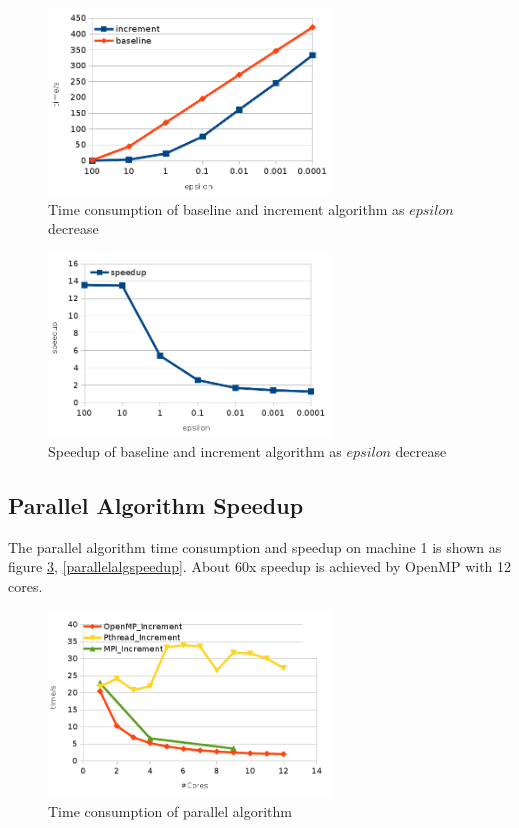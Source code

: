 \documentclass{acm_proc_article-sp}
\begin{document}
\begin{figure}[htbp]
\centering 
\includegraphics[width=7.5cm]{epsilonIncrementTimeConsumption.png}
\caption{Time consumption of baseline and increment algorithm as $epsilon$ decrease}
\label{epsilonIncrementTimeConsumption} 
\end{figure}

\begin{figure}[htbp]
\centering 
\includegraphics[width=7.5cm]{epsilonIncrementSpeedup.png}
\caption{Speedup of baseline and increment algorithm as $epsilon$ decrease}
\label{epsilonIncrementSpeedup} 
\end{figure}

\subsection{Parallel Algorithm Speedup}

The parallel algorithm time consumption and speedup on machine 1 is shown as figure \ref{parallelalgtime}, \ref{parallelalgspeedup}. About 60x speedup is achieved by OpenMP with 12 cores.

\begin{figure}[htbp]
\centering 
\includegraphics[width=7.5cm]{parallelalgtime.png}
\caption{Time consumption of parallel algorithm}
\label{parallelalgtime} 
\end{figure}
\end{document}
